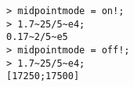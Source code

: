 \begin{center}\begin{minipage}{15cm}\begin{Verbatim}[frame=single]
> midpointmode = on!;
> 1.7~25/5~e4;
0.17~2/5~e5
> midpointmode = off!;
> 1.7~25/5~e4;
[17250;17500]
\end{Verbatim}
\end{minipage}\end{center}
